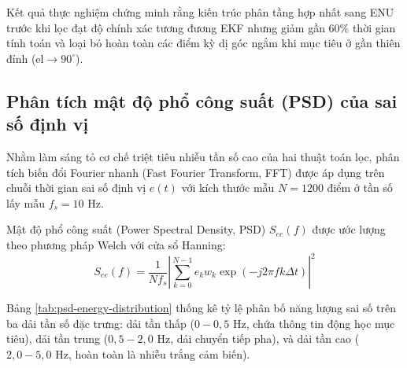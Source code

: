 Kết quả thực nghiệm chứng minh rằng kiến trúc phân tầng hợp nhất sang ENU trước khi lọc đạt độ chính xác tương đương EKF nhưng giảm gần 60\% thời gian tính toán và loại bỏ hoàn toàn các điểm kỳ dị góc ngắm khi mục tiêu ở gần thiên đỉnh ($\text{el} \to 90^\circ$).

\subsection{Phân tích mật độ phổ công suất (PSD) của sai số định vị}

\hspace{0.5cm} Nhằm làm sáng tỏ cơ chế triệt tiêu nhiễu tần số cao của hai thuật toán lọc, phân tích biến đổi Fourier nhanh (Fast Fourier Transform, FFT) được áp dụng trên chuỗi thời gian sai số định vị $e(t)$ với kích thước mẫu $N = 1200$ điểm ở tần số lấy mẫu $f_s = 10$ Hz.

Mật độ phổ công suất (Power Spectral Density, PSD) $S_{ee}(f)$ được ước lượng theo phương pháp Welch với cửa sổ Hanning:
\begin{equation}
S_{ee}(f) = \frac{1}{N f_s} \left| \sum_{k=0}^{N-1} e_k w_k \exp\left(-j 2\pi f k \Delta t\right) \right|^2
\label{eq:psd-welch}
\end{equation}

Bảng \ref{tab:psd-energy-distribution} thống kê tỷ lệ phân bố năng lượng sai số trên ba dải tần số đặc trưng: dải tần thấp ($0 - 0{,}5$ Hz, chứa thông tin động học mục tiêu), dải tần trung ($0{,}5 - 2{,}0$ Hz, dải chuyển tiếp pha), và dải tần cao ($2{,}0 - 5{,}0$ Hz, hoàn toàn là nhiễu trắng cảm biến).

